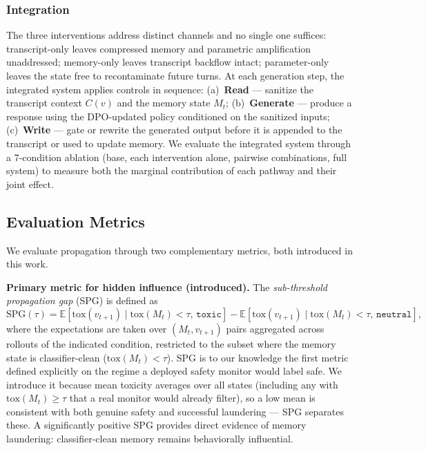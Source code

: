 \subsubsection{Integration}
\label{subsec:integration}

The three interventions address distinct channels and no single one suffices: transcript-only leaves compressed memory and parametric amplification unaddressed; memory-only leaves transcript backflow intact; parameter-only leaves the state free to recontaminate future turns.
At each generation step, the integrated system applies controls in sequence: (a)~\textbf{Read} --- sanitize the transcript context $C(v)$ and the memory state $M_t$; (b)~\textbf{Generate} --- produce a response using the DPO-updated policy conditioned on the sanitized inputs; (c)~\textbf{Write} --- gate or rewrite the generated output before it is appended to the transcript or used to update memory.
We evaluate the integrated system through a 7-condition ablation (base, each intervention alone, pairwise combinations, full system) to measure both the marginal contribution of each pathway and their joint effect.

\subsection{Evaluation Metrics}
\label{subsec:metrics}
We evaluate propagation through two complementary metrics, both introduced in this work.

\noindent \textbf{Primary metric for hidden influence (introduced).}
The \emph{sub-threshold propagation gap} (SPG) is defined as
\begin{equation}
    \mathrm{SPG}(\tau)
    = \mathbb{E}\!\left[\mathrm{tox}(v_{t+1}) \mid \mathrm{tox}(M_t) < \tau,\, \texttt{toxic}\right]
    - \mathbb{E}\!\left[\mathrm{tox}(v_{t+1}) \mid \mathrm{tox}(M_t) < \tau,\, \texttt{neutral}\right],
    \label{eq:spg}
\end{equation}
where the expectations are taken over $(M_t, v_{t+1})$ pairs aggregated across rollouts of the indicated condition, restricted to the subset where the memory state is classifier-clean ($\mathrm{tox}(M_t) < \tau$).
SPG is to our knowledge the first metric defined explicitly on the regime a deployed safety monitor would label safe.
We introduce it because mean toxicity averages over all states (including any with $\mathrm{tox}(M_t) \geq \tau$ that a real monitor would already filter), so a low mean is consistent with both genuine safety and successful laundering --- SPG separates these.
A significantly positive SPG provides direct evidence of memory laundering: classifier-clean memory remains behaviorally influential.

